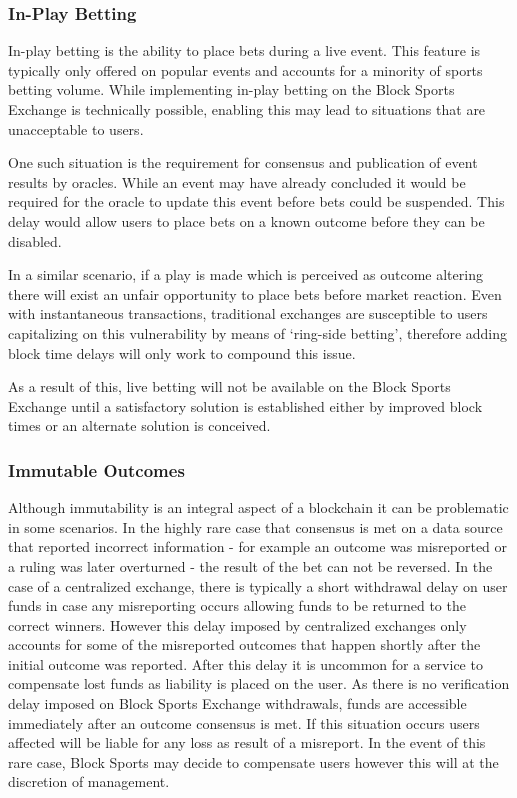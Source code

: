 \documentclass{article}
\begin{document}
		\subsubsection{In-Play Betting}
In-play betting is the ability to place bets during a live event. This feature is typically only offered on popular events and accounts for a minority of sports betting volume. While implementing in-play betting on the Block Sports Exchange is technically possible, enabling this may lead to situations that are unacceptable to users.
 
One such situation is the requirement for consensus and publication of event results by oracles. While an event may have already concluded it would be required for the oracle to update this event before bets could be suspended. This delay would allow users to place bets on a known outcome before they can be disabled.
 
In a similar scenario, if a play is made which is perceived as outcome altering there will exist an unfair opportunity to place bets before market reaction. Even with instantaneous transactions, traditional exchanges are susceptible to users capitalizing on this vulnerability by means of ‘ring-side betting’, therefore adding block time delays will only work to compound this issue. 

As a result of this, live betting will not be available on the Block Sports Exchange until a satisfactory solution is established either by improved block times or an alternate solution is conceived. 

		\subsubsection{Immutable Outcomes}
Although immutability is an integral aspect of a blockchain it can be problematic in some scenarios. In the highly rare case that consensus is met on a data source that reported incorrect information - for example an outcome was misreported or a ruling was later overturned - the result of the bet can not be reversed. In the case of a centralized exchange, there is typically a short withdrawal delay on user funds in case any misreporting occurs allowing funds to be returned to the correct winners. However this delay imposed by centralized exchanges only accounts for some of the misreported outcomes that happen shortly after the initial outcome was reported. After this delay it is uncommon for a service to compensate lost funds as liability is placed on the user. As there is no verification delay imposed on Block Sports Exchange withdrawals, funds are accessible immediately after an outcome consensus is met. If this situation occurs users affected will be liable for any loss as result of a misreport. In the event of this rare case, Block Sports may decide to compensate users however this will at the discretion of management.
\end{document}

